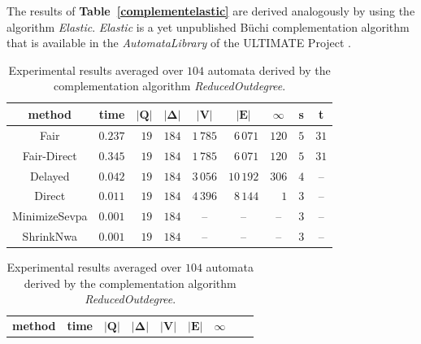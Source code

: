 \documentclass[12pt,oneside,bibliography=totoc,abstracton]{scrartcl}
\newcommand{\emptyccell}{\multicolumn{1}{c}{--}}
\newcommand{\emptyccellrightended}{\multicolumn{1}{c|}{--}}
\newcommand{\tableref}[1]{\textbf{Table~\ref{#1}}}
\newcommand{\libref}[1]{\textbf{\cite{#1}}}
\begin{document}
The results of \tableref{complementelastic} are derived analogously by using the algorithm \textit{Elastic}.
\textit{Elastic} is a yet unpublished Büchi complementation algorithm that is available in the
\textit{AutomataLibrary} of the ULTIMATE Project \libref{ultimate}.
\begin{table}[h]
	 \begin{center}
		\begin{tabular}{|c|lrrrrrrr|}
			\hline
			\multicolumn{1}{|c|}{\cellcolor{black!30}\textbf{method}}
			&\multicolumn{1}{c}{\cellcolor{black!30}\textbf{time}}
			&\multicolumn{1}{c}{\cellcolor{black!30}$\bm{|Q|}$}
			&\multicolumn{1}{c}{\cellcolor{black!30}$\bm{|\Delta|}$}
			&\multicolumn{1}{c}{\cellcolor{black!30}$\bm{|V|}$}
			&\multicolumn{1}{c}{\cellcolor{black!30}$\bm{|E|}$}
			&\multicolumn{1}{c}{\cellcolor{black!30}$\bm{\infty}$}
			&\multicolumn{1}{c}{\cellcolor{black!30}\textbf{s}}
			&\multicolumn{1}{c|}{\cellcolor{black!30}\textbf{t}}\\
			\hline
			Fair			&$0.237$	&$19$	&$184$	&$1\,785$	&$6\,071$	&$120$	&$5$	&$31$\\
			Fair-Direct		&$0.345$	&$19$	&$184$	&$1\,785$	&$6\,071$	&$120$	&$5$	&$31$\\
			Delayed		&$0.042$	&$19$	&$184$	&$3\,056$	&$10\,192$	&$306$	&$4$	&\emptyccellrightended\\
			Direct			&$0.011$	&$19$	&$184$	&$4\,396$	&$8\,144$	&$1$		&$3$	&\emptyccellrightended\\
			MinimizeSevpa	&$0.001$	&$19$	&$184$	&\emptyccell	&\emptyccell	&\emptyccell	&$3$	&\emptyccellrightended\\
			ShrinkNwa		&$0.001$	&$19$	&$184$	&\emptyccell	&\emptyccell	&\emptyccell	&$3$	&\emptyccellrightended\\
			\hline
		\end{tabular}
	\end{center}
	\caption{Experimental results averaged over $104$ automata derived by the
		complementation algorithm \textit{ReducedOutdegree}.}
	\label{complementreducedoutdegree}
	 \begin{center}
		\begin{tabular}{|c|lrrrrrrr|}
			\hline
			\multicolumn{1}{|c|}{\cellcolor{black!30}\textbf{method}}
			&\multicolumn{1}{c}{\cellcolor{black!30}\textbf{time}}
			&\multicolumn{1}{c}{\cellcolor{black!30}$\bm{|Q|}$}
			&\multicolumn{1}{c}{\cellcolor{black!30}$\bm{|\Delta|}$}
			&\multicolumn{1}{c}{\cellcolor{black!30}$\bm{|V|}$}
			&\multicolumn{1}{c}{\cellcolor{black!30}$\bm{|E|}$}
			&\multicolumn{1}{c}{\cellcolor{black!30}$\bm{\infty}$}

\end{tabular}
\end{center}
\end{table}
\end{document}
